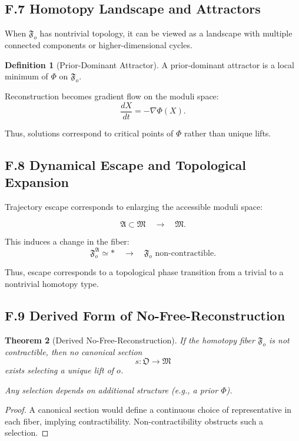 \documentclass[12pt, oneside]{article}
\theoremstyle{plain}
\newtheorem{theorem}{Theorem}[section]
\theoremstyle{definition}
\newtheorem{definition}[theorem]{Definition}
\theoremstyle{remark}
\begin{document}
\subsection{F.7 Homotopy Landscape and Attractors}

When $\mathfrak{F}_o$ has nontrivial topology, it can be viewed as a landscape with multiple connected components or higher-dimensional cycles.

\begin{definition}[Prior-Dominant Attractor]
A prior-dominant attractor is a local minimum of $\Phi$ on $\mathfrak{F}_o$.
\end{definition}

Reconstruction becomes gradient flow on the moduli space:
\[
\frac{dX}{dt} = - \nabla \Phi(X).
\]

Thus, solutions correspond to critical points of $\Phi$ rather than unique lifts.

\subsection{F.8 Dynamical Escape and Topological Expansion}

Trajectory escape corresponds to enlarging the accessible moduli space:

\[
\mathfrak{A} \subset \mathfrak{M} \quad \longrightarrow \quad \mathfrak{M}.
\]

This induces a change in the fiber:
\[
\mathfrak{F}_o^{\mathfrak{A}} \simeq * \quad \longrightarrow \quad \mathfrak{F}_o \text{ non-contractible}.
\]

Thus, escape corresponds to a topological phase transition from a trivial to a nontrivial homotopy type.

\subsection{F.9 Derived Form of No-Free-Reconstruction}

\begin{theorem}[Derived No-Free-Reconstruction]
If the homotopy fiber $\mathfrak{F}_o$ is not contractible, then no canonical section
\[
s : \mathfrak{O} \to \mathfrak{M}
\]
exists selecting a unique lift of $o$.

Any selection depends on additional structure (e.g., a prior $\Phi$).
\end{theorem}

\begin{proof}
A canonical section would define a continuous choice of representative in each fiber, implying contractibility. Non-contractibility obstructs such a selection.
\end{proof}
\end{document}

